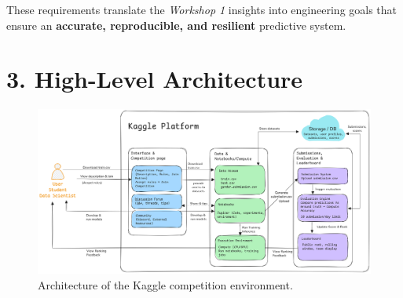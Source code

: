 \documentclass[12pt]{report}
\begin{document}
\noindent
These requirements translate the \textit{Workshop 1} insights into engineering goals that ensure an \textbf{accurate, reproducible, and resilient} predictive system.


\section*{3. High-Level Architecture}
\begin{figure}[H]
    \centering
    \includegraphics[width=\linewidth]{Figure1.png}
    \caption{Architecture of the Kaggle competition environment.}
    \label{fig:system-architecture}
\end{figure}
\end{document}
